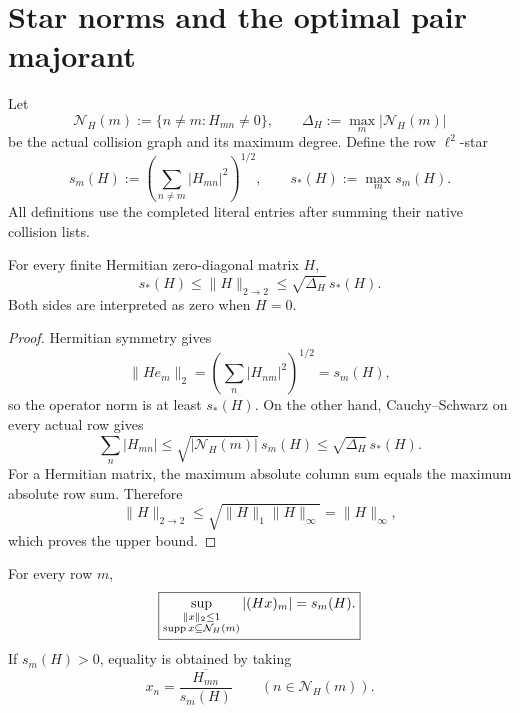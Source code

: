 \section{Star norms and the optimal pair majorant}
\label{sec:tpc68-star-perron}

Let
\[
 \mathcal N_H(m):=\{n\ne m:H_{mn}\ne0\},
 \qquad
 \Delta_H:=\max_m|\mathcal N_H(m)|
\]
be the actual collision graph and its maximum degree.  Define the row
\(\ell^2\)-star
\begin{equation}
 s_m(H):=
 \left(\sum_{n\ne m}|H_{mn}|^2\right)^{1/2},
 \qquad
 s_*(H):=\max_m s_m(H).
 \label{eq:tpc68-star-norm}
\end{equation}
All definitions use the completed literal entries after summing their
native collision lists.

\begin{theorem}
\label{thm:tpc68-star-sandwich}
For every finite Hermitian zero-diagonal matrix \(H\),
\begin{equation}
 \boxed{
 s_*(H)\le\|H\|_{2\to2}
 \le\sqrt{\Delta_H}\,s_*(H).}
 \label{eq:tpc68-star-sandwich}
\end{equation}
Both sides are interpreted as zero when \(H=0\).
\end{theorem}

\begin{proof}
Hermitian symmetry gives
\[
 \|He_m\|_2
 =\left(\sum_n|H_{nm}|^2\right)^{1/2}
 =s_m(H),
\]
so the operator norm is at least \(s_*(H)\).  On the other hand,
Cauchy--Schwarz on every actual row gives
\[
 \sum_n|H_{mn}|
 \le\sqrt{|\mathcal N_H(m)|}\,s_m(H)
 \le\sqrt{\Delta_H}\,s_*(H).
\]
For a Hermitian matrix, the maximum absolute column sum equals the maximum
absolute row sum.  Therefore
\[
 \|H\|_{2\to2}
 \le\sqrt{\|H\|_1\|H\|_\infty}
 =\|H\|_\infty,
\]
which proves the upper bound.
\end{proof}

\begin{proposition}
\label{prop:tpc68-local-star-extremizer}
For every row \(m\),
\begin{equation}
 \boxed{
 \sup_{\substack{\|x\|_2\le1\\
                 \operatorname{supp} x\subseteq\mathcal N_H(m)}}
 |(Hx)_m|
 =s_m(H).}
 \label{eq:tpc68-local-star-sharp}
\end{equation}
If \(s_m(H)>0\), equality is obtained by taking
\[
 x_n=\frac{\overline{H_{mn}}}{s_m(H)}
 \qquad(n\in\mathcal N_H(m)).
\]
\end{proposition}

